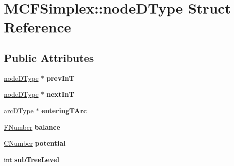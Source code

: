 \hypertarget{struct_m_c_f_simplex_1_1node_d_type}{}\section{M\+C\+F\+Simplex\+:\+:node\+D\+Type Struct Reference}
\label{struct_m_c_f_simplex_1_1node_d_type}
\subsection*{Public Attributes}
\begin{DoxyCompactItemize}
\item 
\mbox{\label{struct_m_c_f_simplex_1_1node_d_type_a8f962ca976a51504e83bb84804e48386}} 
\mbox{\hyperlink{struct_m_c_f_simplex_1_1node_d_type}{node\+D\+Type}} $\ast$ {\bfseries prev\+InT}
\item 
\mbox{\label{struct_m_c_f_simplex_1_1node_d_type_a34ecd346f91b6cc3953830cf5a3ab25a}} 
\mbox{\hyperlink{struct_m_c_f_simplex_1_1node_d_type}{node\+D\+Type}} $\ast$ {\bfseries next\+InT}
\item 
\mbox{\label{struct_m_c_f_simplex_1_1node_d_type_a6f46f01671fea6177d12c650c67e78f7}} 
\mbox{\hyperlink{struct_m_c_f_simplex_1_1arc_d_type}{arc\+D\+Type}} $\ast$ {\bfseries entering\+T\+Arc}
\item 
\mbox{\label{struct_m_c_f_simplex_1_1node_d_type_a6c8c2329e47ec72e395bc8229b4814d6}} 
\mbox{\hyperlink{class_m_c_f_class_aeea3e5951d222b2a8e57de1b4246a909}{F\+Number}} {\bfseries balance}
\item 
\mbox{\label{struct_m_c_f_simplex_1_1node_d_type_a019c07ef3ab5e1a2615f5857559aae5b}} 
\mbox{\hyperlink{class_m_c_f_class_a24d0627ba8213afe1ec4ebeb4508e8f1}{C\+Number}} {\bfseries potential}
\item 
\mbox{\label{struct_m_c_f_simplex_1_1node_d_type_a695254eca5f8f2320a88dc6ee76509e0}} 
int {\bfseries sub\+Tree\+Level}
\item 
\mbox{\label{struct_m_c_f_simplex_1_1node_d_type_a35ed44c067c3b3fcc1ee5d1230031e49}} 

\end{DoxyCompactItemize}
